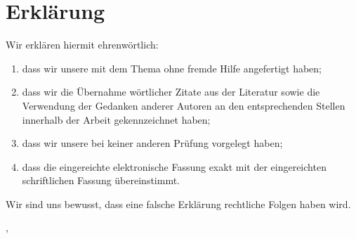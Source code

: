 \thispagestyle{empty}

\section*{Erklärung}
\vspace*{2em}

Wir erklären hiermit ehrenwörtlich:
\begin{enumerate}
\item dass wir unsere {\arbeit} mit dem Thema
{\itshape \pdftitel } ohne fremde Hilfe angefertigt haben;
\item dass wir die Übernahme wörtlicher Zitate aus der Literatur sowie die Verwendung der Gedanken
anderer Autoren an den entsprechenden Stellen innerhalb der Arbeit gekennzeichnet haben;
\item dass wir unsere {\arbeit} bei keiner anderen Prüfung vorgelegt haben;
\item dass die eingereichte elektronische Fassung exakt mit der eingereichten schriftlichen Fassung
übereinstimmt.
\end{enumerate}

Wir sind uns bewusst, dass eine falsche Erklärung rechtliche Folgen haben wird.

\vspace{3em}

\abgabeort, \datumAbgabe
\vspace{4em}

\autor